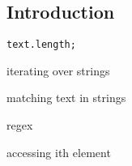 
\subsection{Introduction}


\begin{verbatim}
text.length;
\end{verbatim}

iterating over strings

matching text in strings

regex

accessing ith element

